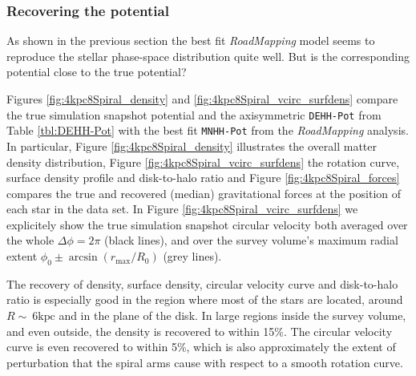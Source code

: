\documentclass[iop,revtex4,numberedappendix,appendixfloats]{emulateapj}
\newcommand{\RM}{{\sl RoadMapping}}
\begin{document}
\begin{figure}[!htbp]
  \label{fig:4kpc8Spiral_DF_comparison}
\end{figure}


\subsubsection{Recovering the potential} \label{sec:4kpc8Spiral_potential}

As shown in the previous section the best fit \RM{} model seems to reproduce the stellar phase-space distribution quite well. But is the corresponding potential close to the true potential? 

Figures \ref{fig:4kpc8Spiral_density} and \ref{fig:4kpc8Spiral_vcirc_surfdens} compare the true simulation snapshot potential and the axisymmetric \texttt{DEHH-Pot} from Table \ref{tbl:DEHH-Pot} with the best fit \texttt{MNHH-Pot} from the \RM{} analysis. In particular, Figure \ref{fig:4kpc8Spiral_density} illustrates the overall matter density distribution, Figure \ref{fig:4kpc8Spiral_vcirc_surfdens} the rotation curve, surface density profile and disk-to-halo ratio and Figure \ref{fig:4kpc8Spiral_forces} compares the true and recovered (median) gravitational forces at the position of each star in the data set. In Figure \ref{fig:4kpc8Spiral_vcirc_surfdens} we explicitely show the true simulation snapshot circular velocity both averaged over the whole $\Delta\phi=2\pi$ (black lines), and over the survey volume's maximum radial extent $\phi_0\pm \arcsin(r_\text{max}/R_0)$ (grey lines).

The recovery of density, surface density, circular velocity curve and disk-to-halo ratio is especially good in the region where most of the stars are located, around $R\sim~6\text{kpc}$ and in the plane of the disk. In large regions inside the survey volume, and even outside, the density is recovered to within 15\%. The circular velocity curve is even recovered to within 5\%, which is also approximately the extent of perturbation that the spiral arms cause with respect to a smooth rotation curve.
\end{document}
